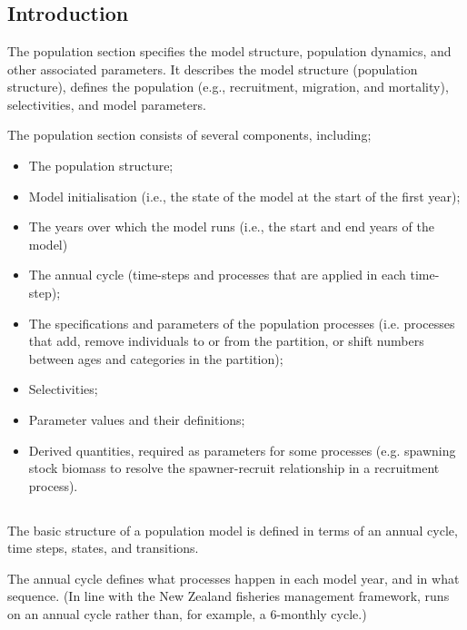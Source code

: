 \section{\label{sec:population-section}}

\subsection{Introduction}
The population section specifies the model structure, population dynamics, and other associated parameters. It describes the model structure (population structure), defines the population  (e.g., recruitment, migration, and mortality), selectivities, and model parameters.

The population section consists of several components, including;
\begin{itemize}
  \item The population structure;
  \item Model initialisation (i.e., the state of the model at the start of the first year);
  \item The years over which the model runs (i.e., the start and end years of the model)
  \item The annual cycle (time-steps and processes that are applied in each time-step);
  \item The specifications and parameters of the population processes (i.e. processes that add, remove individuals to or from the partition, or shift numbers between ages and categories in the partition);
  \item Selectivities;
  \item Parameter values and their definitions;
  \item Derived quantities, required as parameters for some processes (e.g. spawning stock biomass to resolve the spawner-recruit relationship in a recruitment process).
\end{itemize}


\subsection{}

The basic structure of a \cas population model is defined in terms of an annual cycle, time steps, states, and transitions.

The annual cycle defines what processes happen in each model year, and in what sequence. (In line with the New Zealand fisheries management framework, \cas runs on an annual cycle rather than, for example, a 6-monthly cycle.) 

